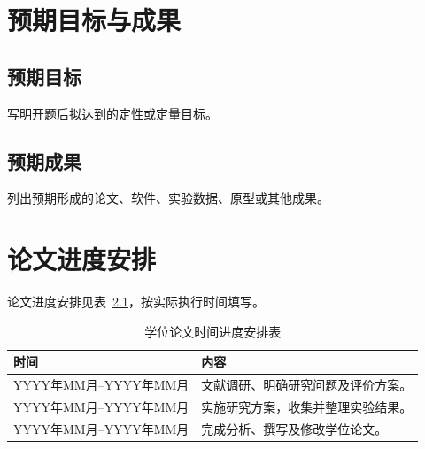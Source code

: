 \chapter{预期目标与成果}

\section{预期目标}
写明开题后拟达到的定性或定量目标。

\section{预期成果}
列出预期形成的论文、软件、实验数据、原型或其他成果。

\chapter{论文进度安排}

论文进度安排见表~\ref{tab:proposal-schedule}，按实际执行时间填写。

\begin{table}[htbp]
  \centering
  \caption{学位论文时间进度安排表}
  \label{tab:proposal-schedule}
  \begin{MasterTable}
  \begin{tabularx}{0.9\textwidth}{@{}l>{\raggedright\arraybackslash}X@{}}
    \toprule
    时间 & 内容 \\
    \midrule
    YYYY年MM月--YYYY年MM月 & 文献调研、明确研究问题及评价方案。 \\
    YYYY年MM月--YYYY年MM月 & 实施研究方案，收集并整理实验结果。 \\
    YYYY年MM月--YYYY年MM月 & 完成分析、撰写及修改学位论文。 \\
    \bottomrule
  \end{tabularx}
  \end{MasterTable}
\end{table}
